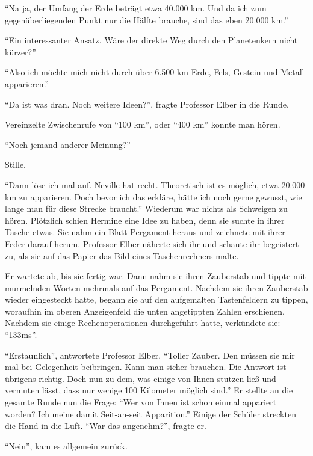 \enquote{Na ja, der Umfang der Erde beträgt etwa 40.000 km. Und da ich zum gegenüberliegenden Punkt nur die Hälfte brauche, sind das eben 20.000 km.}

\enquote{Ein interessanter Ansatz. \gst Wäre der direkte Weg durch den Planetenkern nicht kürzer?}

\enquote{Also ich möchte mich nicht durch über 6.500 km Erde, Fels, Gestein und Metall apparieren.}

\enquote{Da ist was dran. Noch weitere Ideen?}, fragte Professor Elber in die Runde.

Vereinzelte Zwischenrufe von \enquote{100 km}, oder \enquote{400 km} konnte man hören.

\enquote{Noch jemand anderer Meinung?}

Stille.

\enquote{Dann löse ich mal auf. Neville hat recht. Theoretisch ist es möglich, etwa 20.000 km zu apparieren. Doch bevor ich das erkläre, hätte ich noch gerne gewusst, wie lange man für diese Strecke braucht.} Wiederum war nichts als Schweigen zu hören. Plötzlich schien Hermine eine Idee zu haben, denn sie suchte in ihrer Tasche etwas. Sie nahm ein Blatt Pergament heraus und zeichnete mit ihrer Feder darauf herum. Professor Elber näherte sich ihr und schaute ihr begeistert zu, als sie auf das Papier das Bild eines Taschenrechners malte.

Er wartete ab, bis sie fertig war. Dann nahm sie ihren Zauberstab und tippte mit murmelnden Worten mehrmals auf das Pergament. Nachdem sie ihren Zauberstab wieder eingesteckt hatte, begann sie auf den aufgemalten Tastenfeldern zu tippen, woraufhin im oberen Anzeigenfeld die unten angetippten Zahlen erschienen. Nachdem sie einige Rechenoperationen durchgeführt hatte, verkündete sie: \enquote{133ms}.

\enquote{Erstaunlich}, antwortete Professor Elber. \enquote{Toller Zauber. Den müssen sie mir mal bei Gelegenheit beibringen. Kann man sicher brauchen. Die Antwort ist übrigens richtig. Doch nun zu dem, was einige von Ihnen stutzen ließ und vermuten lässt, dass nur wenige 100 Kilometer möglich sind.}  Er stellte an die gesamte Runde nun die Frage: \enquote{Wer von Ihnen ist schon einmal appariert worden? Ich meine damit Seit-an-seit Apparition.} Einige der Schüler streckten die Hand in die Luft. \enquote{War das angenehm?}, fragte er.

\enquote{Nein}, kam es allgemein zurück.

